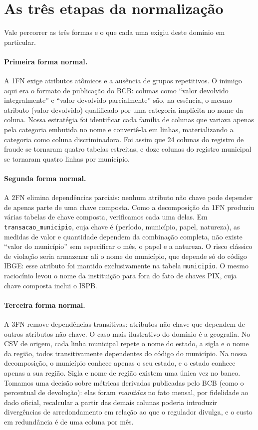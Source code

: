 \documentclass[12pt,a4paper]{article}
\newcommand{\code}[1]{\texttt{#1}}
\begin{document}
\section{As três etapas da normalização}

Vale percorrer as três formas e o que cada uma exigiu deste domínio em particular.

\paragraph{Primeira forma normal.} A 1FN exige atributos atômicos e a
ausência de grupos repetitivos. O inimigo aqui era o formato de publicação
do BCB: colunas como ``valor devolvido integralmente'' e ``valor devolvido
parcialmente'' são, na essência, o mesmo atributo (valor devolvido)
qualificado por uma categoria implícita no nome da coluna. Nossa estratégia
foi identificar cada família de colunas que variava apenas pela
categoria embutida no nome e convertê-la em linhas, materializando a
categoria como coluna discriminadora. Foi assim que 24 colunas do registro
de fraude se tornaram quatro tabelas estreitas, e doze colunas do registro
municipal se tornaram quatro linhas por município.

\paragraph{Segunda forma normal.} A 2FN elimina dependências parciais:
nenhum atributo não chave pode depender de apenas parte de uma chave
composta. Como a decomposição da 1FN produziu várias tabelas de chave
composta, verificamos cada uma delas. Em \code{transacao\_municipio}, cuja
chave é (período, município, papel, natureza), as medidas de valor e
quantidade dependem da combinação completa, não existe ``valor do
município'' sem especificar o mês, o papel e a natureza. O risco clássico de
violação seria armazenar ali o nome do município, que depende só do código
IBGE: esse atributo foi mantido exclusivamente na tabela \code{municipio}.
O mesmo raciocínio levou o nome da instituição para fora do fato de chaves
PIX, cuja chave composta inclui o ISPB.

\paragraph{Terceira forma normal.} A 3FN remove dependências transitivas:
atributos não chave que dependem de outros atributos não chave. O caso mais
ilustrativo do domínio é a geografia. No CSV de origem, cada linha municipal
repete o nome do estado, a sigla e o nome da região, todos
transitivamente dependentes do código do município. Na nossa decomposição,
o município conhece apenas o seu estado, e o estado conhece apenas a sua
região. Sigla e nome de região existem uma única vez no banco. Tomamos uma
decisão sobre métricas derivadas publicadas pelo BCB (como o
percentual de devolução): elas foram \emph{mantidas} no fato mensal, por
fidelidade ao dado oficial, recalcular a partir das demais colunas
poderia introduzir divergências de arredondamento em relação ao que o
regulador divulga, e o custo em redundância é de uma coluna por mês.
\end{document}
